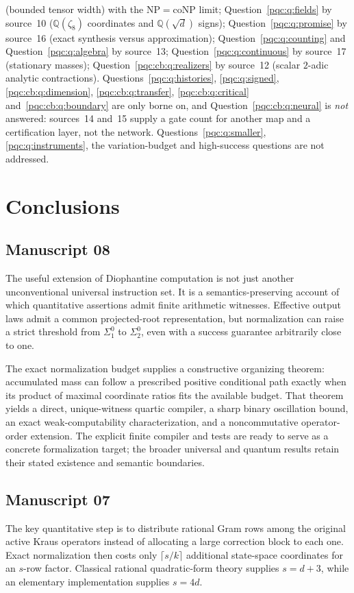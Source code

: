 \documentclass[11pt,letterpaper]{article}
\numberwithin{equation}{section}
\theoremstyle{definition}
\theoremstyle{remark}
\newcommand{\Q}{\mathbb Q}
\newcommand{\sigone}{\Sigma^0_1}
\newcommand{\sigtwo}{\Sigma^0_2}
\begin{document}
\begin{itemize}
(bounded tensor width) with the $\mathrm{NP}=\mathrm{coNP}$ limit;
Question~\ref{pqc:q:fields} by source~10 ($\Q(\zeta_8)$ coordinates and
$\Q(\sqrt d)$ signs); Question~\ref{pqc:q:promise} by source~16 (exact synthesis
versus approximation); Question~\ref{pqc:q:counting} and
Question~\ref{pqc:q:algebra} by source~13; Question~\ref{pqc:q:continuous} by
source~17 (stationary masses); Question~\ref{pqc:cb:q:realizers} by source~12
(scalar $2$-adic analytic contractions). Questions~\ref{pqc:q:histories},
\ref{pqc:q:signed}, \ref{pqc:cb:q:dimension}, \ref{pqc:cb:q:transfer},
\ref{pqc:cb:q:critical} and~\ref{pqc:cb:q:boundary} are only borne on, and
Question~\ref{pqc:cb:q:neural} is \emph{not} answered: sources~14 and~15 supply
a gate count for another map and a certification layer, not the network.
Questions~\ref{pqc:q:smaller}, \ref{pqc:q:instruments}, the variation-budget
and high-success questions are not addressed.
\end{itemize}

\section{Conclusions}
\label{pqc:conv:conclusion}

\subsection{Manuscript 08}
The useful extension of Diophantine computation is not just another
unconventional universal instruction set. It is a semantics-preserving
account of which quantitative assertions admit finite arithmetic witnesses.
Effective output laws admit a common projected-root representation, but
normalization can raise a strict threshold from $\sigone$ to
$\sigtwo$, even with a success guarantee arbitrarily close to one.

The exact normalization budget supplies a constructive organizing theorem:
accumulated mass can follow a prescribed positive conditional path exactly
when its product of maximal coordinate ratios fits the available budget.
That theorem yields a direct, unique-witness quartic compiler, a sharp
binary oscillation bound, an exact weak-computability characterization,
and a noncommutative operator-order extension. The explicit finite compiler
and tests are ready to serve as a concrete formalization target; the broader
universal and quantum results retain their stated existence and semantic
boundaries.

\subsection{Manuscript 07}
The key quantitative step is to distribute rational Gram rows among the original active Kraus operators instead of allocating a large correction block to each one. Exact normalization then costs only $\lceil s/k\rceil$ additional state-space coordinates for an $s$-row factor. Classical rational quadratic-form theory supplies $s=d+3$, while an elementary implementation supplies $s=4d$.
\end{document}
